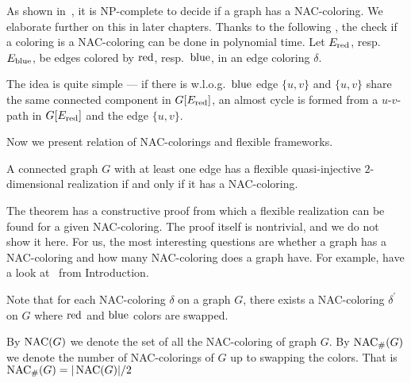 As shown in~\cite{np_complete}, it is NP-complete to decide if a graph has a NAC-coloring.
We elaborate further on this in later chapters.
Thanks to the following ,
the check if a coloring is a NAC-coloring can be done in polynomial time.
Let \( E_{\text{red}}\), resp. \( E_{\text{blue}} \), be edges colored by \( \text{red} \), resp.~\( \text{blue} \),
in an edge coloring \( \delta \).
%
%
The idea is quite simple --- if there is w.l.o.g.\ \( \text{blue} \) edge \( \{u, v\} \)
and \( \{u, v\} \) share the same connected component in \( G[E_{\text{red}}] \),
an almost cycle is formed from a \( u \)-\( v \)-path in \( G[E_{\text{red}}] \)
and the edge \( \{u, v\} \).

Now we present relation of NAC-colorings and flexible frameworks.
%
\begin{theorem}
	A connected graph \( G \) with at least one edge has a flexible
	quasi-injective \( 2 \)-dimensional realization if and only if it has a NAC-coloring.
\end{theorem}
%
The theorem has a constructive proof from which a flexible realization
can be found for a given NAC-coloring.
The proof itself is nontrivial, and we do not show it here.
For us, the most interesting questions are whether a graph has a NAC-coloring
and how many NAC-coloring does a graph have.
For example, have a look at~
from Introduction.

Note that for each NAC-coloring \( \delta \) on a graph \( G \),
there exists a NAC-coloring \( \delta^\prime \) on \( G \)
where \( \text{red} \) and \( \text{blue} \) colors are swapped.
%
\begin{definition}
	By \( \operatorname{NAC}(G) \) we denote the set of all the NAC-coloring of graph \( G \).
	By \( \operatorname{NAC}_{\#} (G) \) we denote the number of NAC-colorings of \( G \)
	up to swapping the colors.
	That is \( \operatorname{NAC}_{\#} (G) = | \operatorname{NAC}(G) | / 2 \)
\end{definition}
%

